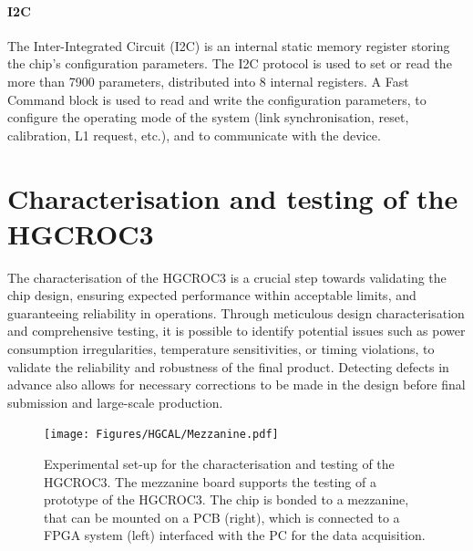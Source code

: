 \paragraph{I2C}
The Inter-Integrated Circuit (I2C) is an internal static memory register storing the chip's configuration parameters.
The I2C protocol is used to set or read the more than 7900 parameters, distributed into 8 internal registers.
A Fast Command block is used to read and write the configuration parameters, to configure the operating mode of the system (link synchronisation, reset, calibration, L1 request, etc.), and to communicate with the device.


\section{Characterisation and testing of the HGCROC3}
\label{sec:Characterisation and testing of the HGCROC3}


The characterisation of the HGCROC3 is a crucial step towards validating the chip design, ensuring expected performance within acceptable limits, and guaranteeing reliability in operations. 
Through meticulous design characterisation and comprehensive testing, it is possible to identify potential issues such as power consumption irregularities, temperature sensitivities, or timing violations, to validate the reliability and robustness of the final product. 
Detecting defects in advance also allows for necessary corrections to be made in the design before final submission and large-scale production.

\bigbreak

\begin{figure}
    \centering
    \texttt{[image: Figures/HGCAL/Mezzanine.pdf]}
    \caption{Experimental set-up for the characterisation and testing of the HGCROC3. The mezzanine board  supports the testing of a prototype of the HGCROC3. The chip is bonded to a mezzanine, that can be mounted on a PCB (right), which is connected to a FPGA system (left) interfaced with the PC for the data acquisition.}
    \label{fig:Mezzanine}
\end{figure}

